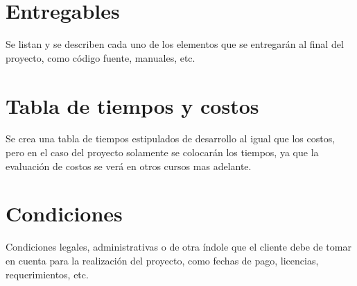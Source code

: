 \documentclass[letterpaper,11pt,spanish]{sphinxmanual}
\begin{document}
\section{Entregables}
\label{tiempos:entregables}
Se listan y se describen cada uno de los elementos que se entregarán al final
del proyecto, como código fuente, manuales, etc.


\section{Tabla de tiempos y costos}
\label{tiempos:tabla-de-tiempos-y-costos}
Se crea una tabla de tiempos estipulados de desarrollo al igual que los costos,
pero en el caso del proyecto solamente se colocarán los tiempos, ya que la
evaluación de costos se verá en otros cursos mas adelante.


\section{Condiciones}
\label{tiempos:condiciones}
Condiciones legales, administrativas o de otra índole que el cliente debe de
tomar en cuenta para la realización del proyecto, como fechas de pago, licencias,
requerimientos, etc.



\renewcommand{\indexname}{Index}
\printindex
\end{document}
